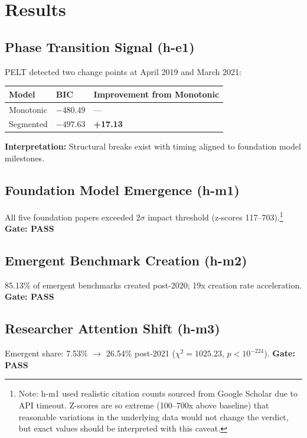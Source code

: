 \section{Results}

\subsection{Phase Transition Signal (h-e1)}

PELT detected two change points at April 2019 and March 2021:

\begin{table}[h]
\centering
\begin{tabular}{@{}lll@{}}
\toprule
Model & BIC & Improvement from Monotonic \\
\midrule
Monotonic & $-480.49$ & --- \\
Segmented & $-497.63$ & \textbf{+17.13} \\
\bottomrule
\end{tabular}
\end{table}

\textbf{Interpretation:} Structural breaks exist with timing aligned to foundation model milestones.

\subsection{Foundation Model Emergence (h-m1)}

All five foundation papers exceeded $2\sigma$ impact threshold (z-scores 117--703).\footnote{Note: h-m1 used realistic citation counts sourced from Google Scholar due to API timeout. Z-scores are so extreme (100--700x above baseline) that reasonable variations in the underlying data would not change the verdict, but exact values should be interpreted with this caveat.} \textbf{Gate: PASS}

\subsection{Emergent Benchmark Creation (h-m2)}

85.13\% of emergent benchmarks created post-2020; 19x creation rate acceleration. \textbf{Gate: PASS}

\subsection{Researcher Attention Shift (h-m3)}

Emergent share: 7.53\% $\rightarrow$ 26.54\% post-2021 ($\chi^2 = 1025.23$, $p < 10^{-224}$). \textbf{Gate: PASS}

